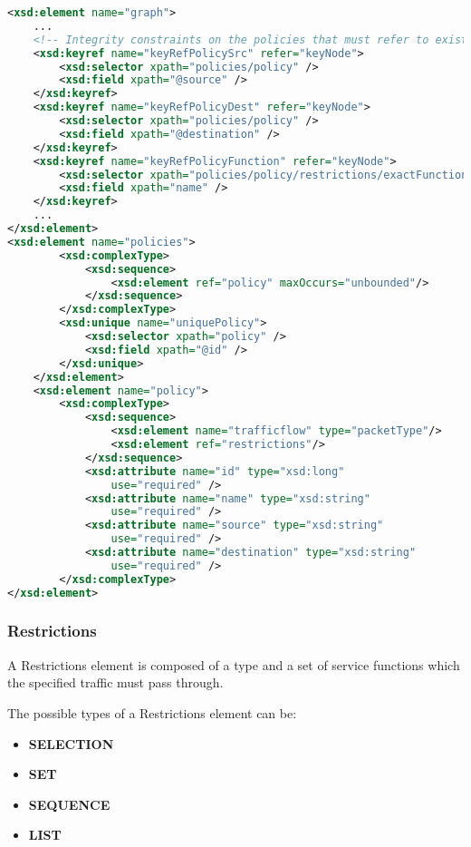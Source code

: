 \begin{lstlisting}[language=XML, caption=Policy schema code snippet]
<xsd:element name="graph">
    ...
    <!-- Integrity constraints on the policies that must refer to existing nodes -->
    <xsd:keyref name="keyRefPolicySrc" refer="keyNode">
        <xsd:selector xpath="policies/policy" />
        <xsd:field xpath="@source" />
    </xsd:keyref>
    <xsd:keyref name="keyRefPolicyDest" refer="keyNode">
        <xsd:selector xpath="policies/policy" />
        <xsd:field xpath="@destination" />
    </xsd:keyref>
    <xsd:keyref name="keyRefPolicyFunction" refer="keyNode">
        <xsd:selector xpath="policies/policy/restrictions/exactFunction" />
        <xsd:field xpath="name" />
    </xsd:keyref>
    ...
</xsd:element>
<xsd:element name="policies">
     	<xsd:complexType>
            <xsd:sequence>
                <xsd:element ref="policy" maxOccurs="unbounded"/>
            </xsd:sequence>
        </xsd:complexType>
        <xsd:unique name="uniquePolicy">
            <xsd:selector xpath="policy" />
            <xsd:field xpath="@id" />
        </xsd:unique>
    </xsd:element>
    <xsd:element name="policy">
        <xsd:complexType>
            <xsd:sequence>
                <xsd:element name="trafficflow" type="packetType"/>
                <xsd:element ref="restrictions"/>
            </xsd:sequence>
            <xsd:attribute name="id" type="xsd:long"
                use="required" />
            <xsd:attribute name="name" type="xsd:string"
                use="required" />
            <xsd:attribute name="source" type="xsd:string"
                use="required" />
            <xsd:attribute name="destination" type="xsd:string"
                use="required" />
        </xsd:complexType>
</xsd:element>
\end{lstlisting}

\subsubsection*{Restrictions}
A Restrictions element is composed of a type and a set of service functions which the specified traffic must pass through.

The possible types of a Restrictions element can be:
\begin{itemize}
 \item \textbf{SELECTION}
 \item \textbf{SET}
 \item \textbf{SEQUENCE}
 \item \textbf{LIST}
\end{itemize}


